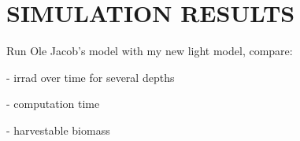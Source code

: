 \chapter{SIMULATION RESULTS}

Run Ole Jacob's model with my new light model, compare:

- irrad over time for several depths

- computation time

- harvestable biomass